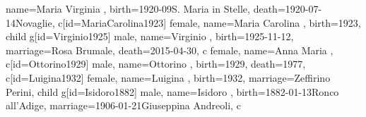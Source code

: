 \documentclass{article}
\begin{document}
\begin{midpage}
\begin{center}
\begin{genealogypicture}
{{{{{{{{{{{                                            name={Maria Virginia },
                                            birth={1920-09}{S. Maria in Stelle},
                                            death={1920-07-14}{Novaglie},
                                        }
                                        c[id=MariaCarolina1923]{
                                            female,
                                            name={Maria Carolina },
                                            birth={1923}{},
                                        }
                                        child{
                                            g[id=Virginio1925]{
                                                male,
                                                name={Virginio },
                                                birth={1925-11-12}{},
                                                marriage={Rosa Brumale}{},
                                                death={2015-04-30}{},
                                            }
                                            c{
                                                female,
                                                name={Anna Maria },
                                            }
                                        }
                                        c[id=Ottorino1929]{
                                            male,
                                            name={Ottorino },
                                            birth={1929}{},
                                            death={1977}{},
                                        }
                                        c[id=Luigina1932]{
                                            female,
                                            name={Luigina },
                                            birth={1932}{},
                                            marriage={Zeffirino Perini}{},
                                        }
                                    }
                                    child{
                                        g[id=Isidoro1882]{
                                            male,
                                            name={Isidoro },
                                            birth={1882-01-13}{Ronco all'Adige},
                                            marriage={1906-01-21}{Giuseppina Andreoli},
                                        }
                                        c{
}}}}}}}}}}}
\end{genealogypicture}
\end{center}
\end{midpage}
\end{document}
